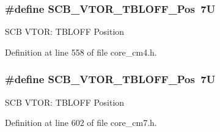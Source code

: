 \subsubsection[{\texorpdfstring{S\+C\+B\+\_\+\+V\+T\+O\+R\+\_\+\+T\+B\+L\+O\+F\+F\+\_\+\+Pos}{SCB_VTOR_TBLOFF_Pos}}]{\setlength{\rightskip}{0pt plus 5cm}\#define S\+C\+B\+\_\+\+V\+T\+O\+R\+\_\+\+T\+B\+L\+O\+F\+F\+\_\+\+Pos~7U}\hypertarget{group___c_m_s_i_s___s_c_b_gac6a55451ddd38bffcff5a211d29cea78}{}\label{group___c_m_s_i_s___s_c_b_gac6a55451ddd38bffcff5a211d29cea78}
S\+CB V\+T\+OR\+: T\+B\+L\+O\+FF Position 

Definition at line 558 of file core\+\_\+cm4.\+h.

\subsubsection[{\texorpdfstring{S\+C\+B\+\_\+\+V\+T\+O\+R\+\_\+\+T\+B\+L\+O\+F\+F\+\_\+\+Pos}{SCB_VTOR_TBLOFF_Pos}}]{\setlength{\rightskip}{0pt plus 5cm}\#define S\+C\+B\+\_\+\+V\+T\+O\+R\+\_\+\+T\+B\+L\+O\+F\+F\+\_\+\+Pos~7U}\hypertarget{group___c_m_s_i_s___s_c_b_gac6a55451ddd38bffcff5a211d29cea78}{}\label{group___c_m_s_i_s___s_c_b_gac6a55451ddd38bffcff5a211d29cea78}
S\+CB V\+T\+OR\+: T\+B\+L\+O\+FF Position 

Definition at line 602 of file core\+\_\+cm7.\+h.

